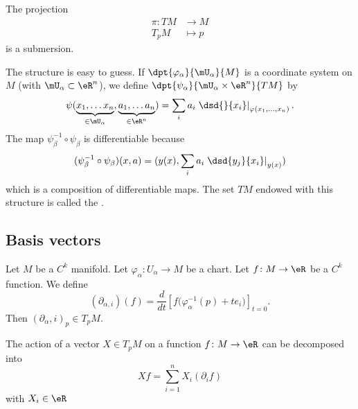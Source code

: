 \begin{proposition}			\label{PROPooMDDPooXeQwrH}
	The projection
	\begin{equation}
		\begin{aligned}
			\pi \colon TM & \to M     \\
			T_pM          & \mapsto p
		\end{aligned}
	\end{equation}
	is a submersion.
\end{proposition}

The structure is easy to guess. If $\dpt{\varphi_{\alpha}}{\mU_{\alpha}}{M}$ is a coordinate system on $M$ (with $\mU_{\alpha}\subset\eR^n$), we define $\dpt{\psi_{\alpha}}{\mU_{\alpha}\times \eR^n}{TM}$ by
\[
	\psi( \underbrace{x_1,\ldots x_n}_{\in\mU_{\alpha}},\underbrace{a_1,\ldots a_n}_{\in\eR^n}  )
	=\sum_i a_i\left.\dsd{}{x_i}\right|_{\varphi(x_1,\ldots,x_n)}.
\]
The map $\psi_{\beta}^{-1}\circ\psi_{\beta}$ is differentiable because
\[
	(\psi_{\beta}^{-1}\circ\psi_{\beta})(x,a)=( y(x),\sum_i a_i\left.\dsd{y_j}{x_i}\right|_{y(x)}  )
\]
which is a composition of differentiable maps. The set $TM$ endowed with this structure is called the .


\subsection{Basis vectors}

\begin{propositionDef}
	Let \( M\) be a \( C^k\) manifold. Let \(\varphi_{\alpha}\colon U_{\alpha} \to M  \) be a chart. Let \(f \colon M\to \eR  \) be a \( C^k\) function. We define
	\begin{equation}
		(\partial_{\alpha,i})(f)=\frac{d}{dt} \left[ f\big( \varphi_{\alpha}^{-1}(p)+te_i \big)  \right]_{t=0}.
	\end{equation}
	Then \( (\partial_\alpha, i)_p\in T_pM\).
\end{propositionDef}

\begin{lemma}       \label{LEMooXDESooHXzIJU}
	The action of a vector \( X\in T_pM\) on a function \( f\colon M\to \eR\) can be decomposed into
	\begin{equation}
		Xf=\sum_{i=1}^n X_i(\partial_if)
	\end{equation}
	with \( X_i\in\eR\)
\end{lemma}

